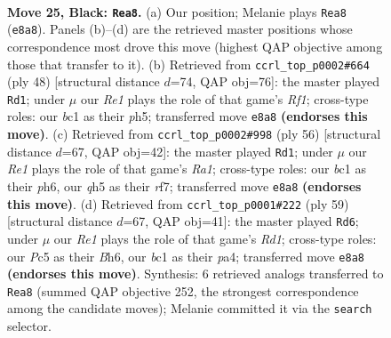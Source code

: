 \documentclass[11pt]{article}
\begin{document}
\clearpage

\begin{figure}[p]\centering
\begin{subfigure}{0.46\textwidth}\centering
\resizebox{\linewidth}{!}{%
\newchessgame
\chessboard[
  setfen={4r1k1/2p1qp2/r6p/2p1p1pQ/2P1P1P1/3P4/5K2/1NB2R2 b - - 7 25},
  showmover=false,
  pgfstyle=straightmove, color=movearrow, markmove={e8-a8}
]}
\caption{}
\end{subfigure}\hfill
\begin{subfigure}{0.46\textwidth}\centering
\resizebox{\linewidth}{!}{%
\newchessgame
\chessboard[
  setfen={r5k1/p4p2/1p4p1/7p/3q3P/1P4P1/1PQ2P2/5RK1 w - - 0 25},
  showmover=false,
  pgfstyle=straightmove, color=movearrow, markmove={f1-d1}
]}
\caption{}
\end{subfigure}
\\[4pt]
\begin{subfigure}{0.46\textwidth}\centering
\resizebox{\linewidth}{!}{%
\newchessgame
\chessboard[
  setfen={6k1/1p3r2/p6p/2Ppq2P/6P1/5P1p/PP3Q2/R4K2 w - - 0 29},
  showmover=false,
  pgfstyle=straightmove, color=movearrow, markmove={a1-d1}
]}
\caption{}
\end{subfigure}\hfill
\begin{subfigure}{0.46\textwidth}\centering
\resizebox{\linewidth}{!}{%
\newchessgame
\chessboard[
  setfen={3r2k1/2q4p/Q5pb/p3pp2/P2p4/5P2/6PP/1R1R3K b - - 1 30},
  showmover=false,
  pgfstyle=straightmove, color=movearrow, markmove={d8-d6}
]}
\caption{}
\end{subfigure}
\caption{\textbf{Move 25, Black: \texttt{Rea8}.} (a) Our position; Melanie plays \texttt{Rea8} (\texttt{e8a8}). Panels (b)--(d) are the retrieved master positions whose correspondence most drove this move (highest QAP objective among those that transfer to it). (b) Retrieved from \texttt{ccrl\_top\_p0002\#664} (ply 48) [structural distance $d$=74, QAP obj=76]: the master played \texttt{Rd1}; under $\mu$ our \emph{Re1} plays the role of that game's \emph{Rf1}; cross-type roles: our \emph{b}c1 as their \emph{p}h5; transferred move \texttt{e8a8} \textbf{(endorses this move)}. (c) Retrieved from \texttt{ccrl\_top\_p0002\#998} (ply 56) [structural distance $d$=67, QAP obj=42]: the master played \texttt{Rd1}; under $\mu$ our \emph{Re1} plays the role of that game's \emph{Ra1}; cross-type roles: our \emph{b}c1 as their \emph{p}h6, our \emph{q}h5 as their \emph{r}f7; transferred move \texttt{e8a8} \textbf{(endorses this move)}. (d) Retrieved from \texttt{ccrl\_top\_p0001\#222} (ply 59) [structural distance $d$=67, QAP obj=41]: the master played \texttt{Rd6}; under $\mu$ our \emph{Re1} plays the role of that game's \emph{Rd1}; cross-type roles: our \emph{P}c5 as their \emph{B}h6, our \emph{b}c1 as their \emph{p}a4; transferred move \texttt{e8a8} \textbf{(endorses this move)}. Synthesis: 6 retrieved analogs transferred to \texttt{Rea8} (summed QAP objective 252, the strongest correspondence among the candidate moves); Melanie committed it via the \texttt{search} selector.}
\label{fig:thought-m49}
\end{figure}
\end{document}
